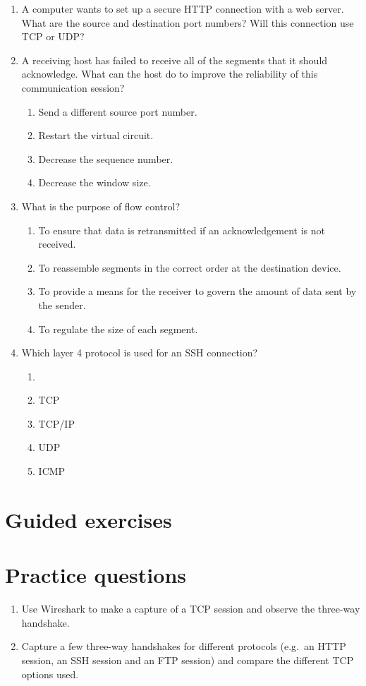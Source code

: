 \begin{enumerate}
\item
   A computer wants to set up a secure \acs{HTTP} connection with a web server.
   What are the source and destination port numbers?
   Will this connection use \acs{TCP} or \acs{UDP}?
\item
   A receiving host has failed to receive all of the segments that it should acknowledge.
   What can the host do to improve the reliability of this communication session?
   \begin{enumerate}
   \item Send a different source port number.
   \item Restart the virtual circuit.
   \item Decrease the sequence number.
   \item Decrease the window size.
   \end{enumerate}
\item What is the purpose of flow control?
   \begin{enumerate}
   \item To ensure that data is retransmitted if an acknowledgement is not received.
   \item To reassemble segments in the correct order at the destination device.
   \item To provide a means for the receiver to govern the amount of data sent by the sender.
   \item To regulate the size of each segment.
   \end{enumerate}
\item
   Which layer 4 protocol is used for an \acs{SSH} connection?
   \begin{enumerate}
   \item \IP
   \item \acs{TCP}
   \item \acs{TCP}/\acs{IP}
   \item \acs{UDP}
   \item \acs{ICMP}
   \end{enumerate}
\end{enumerate}


\section{Guided exercises}
\label{sec:transport-guided-ex}



\section{Practice questions}
\label{sec:transport-practice-qu}
\begin{enumerate}
\item
   Use Wireshark to make a capture of a \acs{TCP} session and observe the three-way handshake.
\item
   Capture a few three-way handshakes for different protocols (e.g.~an \acs{HTTP} session, an \acs{SSH} session and an \acs{FTP} session) and compare the different \acs{TCP} options used.
\end{enumerate}



